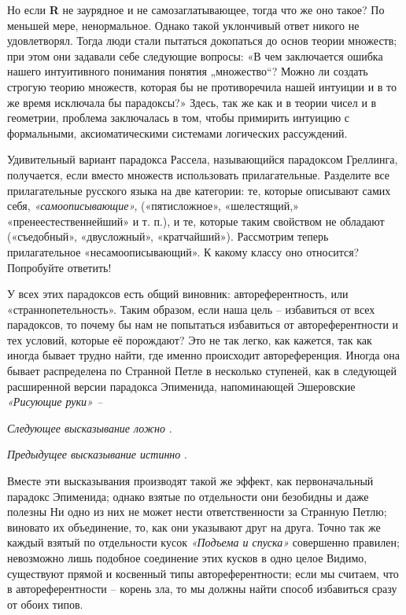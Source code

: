 \documentclass[../main.tex]{subfiles}
\begin{document}
Но если \textbf{R} не заурядное и не самозаглатывающее, тогда что же оно такое? По меньшей мере, ненормальное. Однако такой уклончивый ответ никого не удовлетворял. Тогда люди стали пытаться докопаться до основ теории множеств; при этом они задавали себе следующие вопросы: «В чем заключается ошибка нашего интуитивного понимания понятия „множество``? Можно ли создать строгую теорию множеств, которая бы не противоречила нашей интуиции и в то же время исключала бы парадоксы?» Здесь, так же как и в теории чисел и в геометрии, проблема заключалась в том, чтобы примирить интуицию с формальными, аксиоматическими системами логических рассуждений.

Удивительный вариант парадокса Рассела, называющийся парадоксом Греллинга, получается, если вместо множеств использовать прилагательные. Разделите все прилагательные русского языка на две категории: те, которые описывают самих себя, \emph{«самоописывающие»,} («пятисложное», «шелестящий,» «пренеестественнейший» и т. п.), и те, которые таким свойством не обладают («съедобный», «двусложный», «кратчайший»). Рассмотрим теперь прилагательное «несамоописывающий». К какому классу оно относится? Попробуйте ответить!

У всех этих парадоксов есть общий виновник: автореферентность, или «страннопетельность». Таким образом, если наша цель \--- избавиться от всех парадоксов, то почему бы нам не попытаться избавиться от автореферентности и тех условий, которые её порождают? Это не так легко, как кажется, так как иногда бывает трудно найти, где именно происходит автореференция. Иногда она бывает распределена по Странной Петле в несколько ступеней, как в следующей расширенной версии парадокса Эпименида, напоминающей Эшеровские \emph{«Рисующие руки» \---}

\emph{Следующее высказывание ложно} .

\emph{Предыдущее высказывание истинно} .

Вместе эти высказывания производят такой же эффект, как первоначальный парадокс Эпименида; однако взятые по отдельности они безобидны и даже полезны Ни одно из них не может нести ответственности за Странную Петлю; виновато их объединение, то, как они указывают друг на друга. Точно так же каждый взятый по отдельности кусок \emph{«Подъема и спуска»} совершенно правилен; невозможно лишь подобное соединение этих кусков в одно целое Видимо, существуют прямой и косвенный типы автореферентности; если мы считаем, что в автореферентности \--- корень зла, то мы должны найти способ избавиться сразу от обоих типов.
\end{document}
